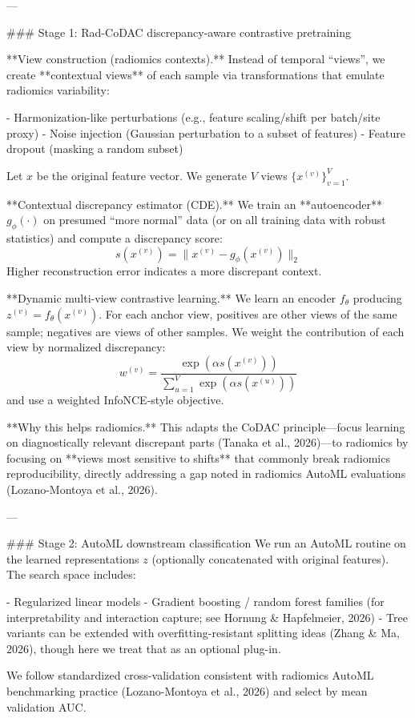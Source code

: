 ---

### Stage 1: Rad-CoDAC discrepancy-aware contrastive pretraining  

**View construction (radiomics contexts).**  
Instead of temporal “views”, we create **contextual views** of each sample via transformations that emulate radiomics variability:

- Harmonization-like perturbations (e.g., feature scaling/shift per batch/site proxy)  
- Noise injection (Gaussian perturbation to a subset of features)  
- Feature dropout (masking a random subset)  

Let \( x \) be the original feature vector. We generate \( V \) views \( \{x^{(v)}\}_{v=1}^V \).

**Contextual discrepancy estimator (CDE).**  
We train an **autoencoder** \( g_\phi(\cdot) \) on presumed “more normal” data (or on all training data with robust statistics) and compute a discrepancy score:
\[
s(x^{(v)}) = \|x^{(v)} - g_\phi(x^{(v)})\|_2
\]
Higher reconstruction error indicates a more discrepant context.

**Dynamic multi-view contrastive learning.**  
We learn an encoder \( f_\theta \) producing \( z^{(v)} = f_\theta(x^{(v)}) \). For each anchor view, positives are other views of the same sample; negatives are views of other samples. We weight the contribution of each view by normalized discrepancy:
\[
w^{(v)} = \frac{\exp(\alpha s(x^{(v)}))}{\sum_{u=1}^V \exp(\alpha s(x^{(u)}))}
\]
and use a weighted InfoNCE-style objective.

**Why this helps radiomics.**  
This adapts the CoDAC principle—focus learning on diagnostically relevant discrepant parts (Tanaka et al., 2026)—to radiomics by focusing on **views most sensitive to shifts** that commonly break radiomics reproducibility, directly addressing a gap noted in radiomics AutoML evaluations (Lozano-Montoya et al., 2026).

---

### Stage 2: AutoML downstream classification  
We run an AutoML routine on the learned representations \( z \) (optionally concatenated with original features). The search space includes:

- Regularized linear models  
- Gradient boosting / random forest families (for interpretability and interaction capture; see Hornung & Hapfelmeier, 2026)  
- Tree variants can be extended with overfitting-resistant splitting ideas (Zhang & Ma, 2026), though here we treat that as an optional plug-in.

We follow standardized cross-validation consistent with radiomics AutoML benchmarking practice (Lozano-Montoya et al., 2026) and select by mean validation AUC.

